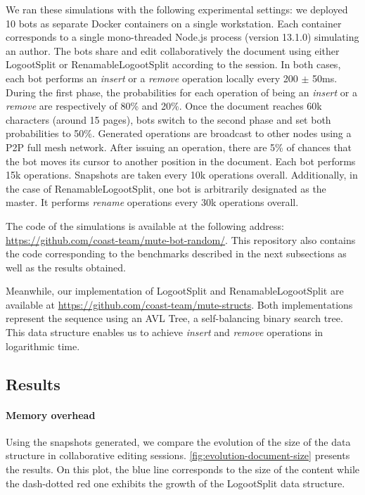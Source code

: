 \documentclass[sigplan,10pt]{acmart}
\begin{document}
We ran these simulations with the following experimental settings: we deployed 10 bots as separate Docker containers on a single workstation.
Each container corresponds to a single mono-threaded Node.js process (version 13.1.0) simulating an author.
The bots share and edit collaboratively the document using either LogootSplit or RenamableLogootSplit according to the session.
In both cases, each bot performs an \emph{insert} or a \emph{remove} operation locally every 200 $\pm$ 50ms.
During the first phase, the probabilities for each operation of being an \emph{insert} or a \emph{remove} are respectively of 80\% and 20\%.
Once the document reaches 60k characters (around 15 pages), bots switch to the second phase and set both probabilities to 50\%.
Generated operations are broadcast to other nodes using a \ac{P2P} full mesh network.
After issuing an operation, there are 5\% of chances that the bot moves its cursor to another position in the document.
Each bot performs 15k operations.
Snapshots are taken every 10k operations overall.
Additionally, in the case of RenamableLogootSplit, one bot is arbitrarily designated as the master.
It performs \emph{rename} operations every 30k operations overall.

The code of the simulations is available at the following address: \url{https://github.com/coast-team/mute-bot-random/}.
This repository also contains the code corresponding to the benchmarks described in the next subsections as well as the results obtained.

\begin{sloppypar}
Meanwhile, our implementation of LogootSplit and RenamableLogootSplit are available at \url{https://github.com/coast-team/mute-structs}.
Both implementations represent the sequence using an AVL Tree, a self-balancing binary search tree.
This data structure enables us to achieve \emph{insert} and \emph{remove} operations in logarithmic time.
\end{sloppypar}

\subsection{Results}

\paragraph{Memory overhead}

Using the snapshots generated, we compare the evolution of the size of the data structure in collaborative editing sessions.
\autoref{fig:evolution-document-size} presents the results.
On this plot, the blue line corresponds to the size of the content while the dash-dotted red one exhibits the growth of the LogootSplit data structure.
\end{document}
